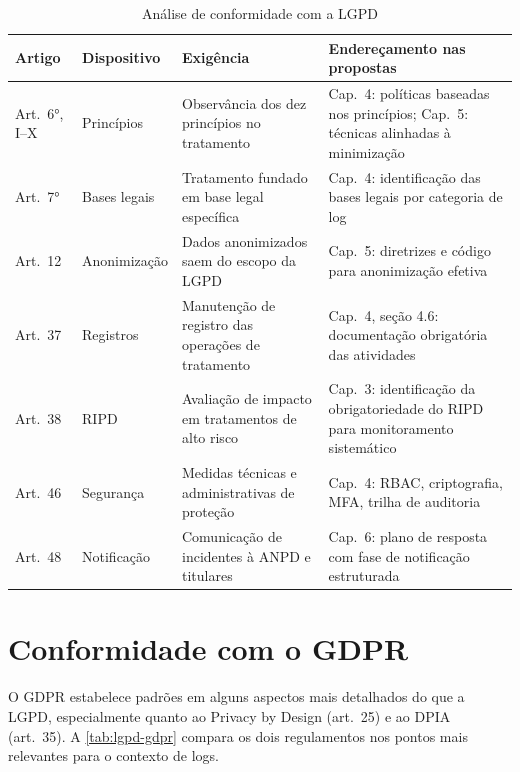\begin{table}[htb]
    \ABNTEXfontereduzida
    \caption{Análise de conformidade com a LGPD}
    \label{tab:conformidade-lgpd}
    \begin{tabular}{p{1.8cm}p{2.5cm}p{3.5cm}p{5.5cm}}
        \toprule
        \textbf{Artigo} & \textbf{Dispositivo} & \textbf{Exigência} & \textbf{Endereçamento nas propostas} \\
        \midrule
        Art.\ 6°, I--X & Princípios & Observância dos dez princípios no tratamento & Cap.\ 4: políticas baseadas nos princípios; Cap.\ 5: técnicas alinhadas à minimização \\
        Art.\ 7° & Bases legais & Tratamento fundado em base legal específica & Cap.\ 4: identificação das bases legais por categoria de log \\
        Art.\ 12 & Anonimização & Dados anonimizados saem do escopo da LGPD & Cap.\ 5: diretrizes e código para anonimização efetiva \\
        Art.\ 37 & Registros & Manutenção de registro das operações de tratamento & Cap.\ 4, seção 4.6: documentação obrigatória das atividades \\
        Art.\ 38 & RIPD & Avaliação de impacto em tratamentos de alto risco & Cap.\ 3: identificação da obrigatoriedade do RIPD para monitoramento sistemático \\
        Art.\ 46 & Segurança & Medidas técnicas e administrativas de proteção & Cap.\ 4: RBAC, criptografia, MFA, trilha de auditoria \\
        Art.\ 48 & Notificação & Comunicação de incidentes à ANPD e titulares & Cap.\ 6: plano de resposta com fase de notificação estruturada \\
        \bottomrule
    \end{tabular}
\end{table}

\section{Conformidade com o GDPR}
\label{sec:conformidade-gdpr}

O GDPR estabelece padrões em alguns aspectos mais detalhados do que a LGPD, especialmente quanto ao Privacy by Design (art.\ 25) e ao DPIA (art.\ 35). A \autoref{tab:lgpd-gdpr} compara os dois regulamentos nos pontos mais relevantes para o contexto de logs.

